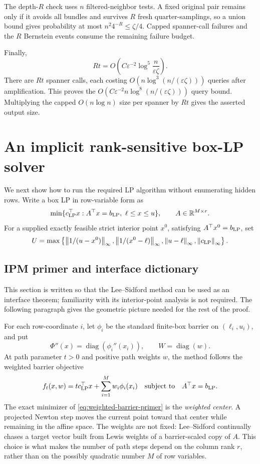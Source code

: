 \documentclass[11pt]{article}
\theoremstyle{definition}
\newcommand{\R}{\mathbb{R}}
\newcommand{\eps}{\varepsilon}
\newcommand{\diag}{\operatorname{diag}}
\newcommand{\norm}[1]{\left\lVert #1\right\rVert}
\newcommand{\set}[1]{\left\{#1\right\}}
\begin{document}
The depth-$R$ check uses $n$ filtered-neighbor tests.  A fixed original pair
remains only if it avoids all
bundles and survives $R$ fresh quarter-samplings, so a union bound gives
probability at most $n^2 4^{-R}\le\zeta/4$.  Capped spanner-call failures and
the $R$ Bernstein events consume the remaining failure budget.

Finally,
\[
 Rt=O\!\left(C\eps^{-2}\log^5\frac{n}{\eps\zeta}\right).
\]
There are $Rt$ spanner calls, each costing
$O(n\log^3(n/(\eps\zeta)))$ queries after amplification.  This proves the
$O(C\eps^{-2}n\log^8(n/(\eps\zeta)))$ query bound.  Multiplying the capped
$O(n\log n)$ size per spanner by $Rt$ gives the asserted output size.

\section{An implicit rank-sensitive box-LP solver}
\label{sec:implicit-lp}

We next show how to run the required LP algorithm without enumerating hidden
rows.  Write a box LP in row-variable form as
\begin{equation}\label{eq:generic-box-lp}
 \min\{c_{\rm LP}^\top x:A^\top x=b_{\rm LP},\ \ell\le x\le u\},
 \qquad A\in\R^{M\times r}.
\end{equation}
For a supplied exactly feasible strict interior point $x^0$, satisfying
$A^\top x^0=b_{\rm LP}$, set
\[
 U=\max\set{
  \norm{1/(u-x^0)}_\infty,
  \norm{1/(x^0-\ell)}_\infty,
 \norm{u-\ell}_\infty,
 \norm{c_{\rm LP}}_\infty}.
\]

\subsection{IPM primer and interface dictionary}

This section is written so that the Lee--Sidford method can be used as an
interface theorem; familiarity with its interior-point analysis is not
required.  The following paragraph gives the geometric picture needed for the
rest of the proof.

For each row-coordinate $i$, let $\phi_i$ be the standard finite-box barrier
on $(\ell_i,u_i)$, and put
\[
 \Phi''(x)=\diag(\phi_i''(x_i)),\qquad W=\diag(w).
\]
At path parameter $t>0$ and positive path weights $w$, the method follows the
weighted barrier objective
\begin{equation}\label{eq:weighted-barrier-primer}
 f_t(x,w)=t c_{\rm LP}^{\top}x+\sum_{i=1}^M w_i\phi_i(x_i)
 \quad\text{subject to}\quad A^\top x=b_{\rm LP}.
\end{equation}
The exact minimizer of \eqref{eq:weighted-barrier-primer} is the
\emph{weighted center}.  A projected Newton step moves the current point
toward that center while remaining in the affine space.  The weights are not
fixed: Lee--Sidford continually chases a target vector built from Lewis
weights of a barrier-scaled copy of $A$.  This choice is what makes the number
of path steps depend on the column rank $r$, rather than on the possibly
quadratic number $M$ of row variables.
\end{document}
